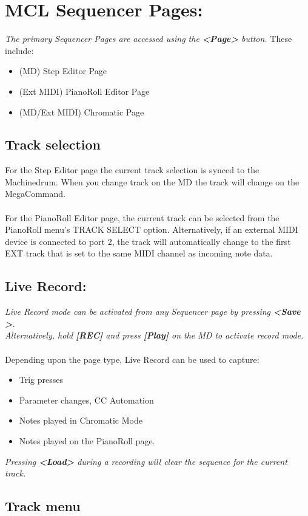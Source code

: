 \chapter{MCL Sequencer Pages:}

\textit{The primary Sequencer Pages are accessed using the \textbf{<Page>} button.} These include:
\begin{itemize}
    \item (MD) Step Editor Page
    \item (Ext MIDI) PianoRoll Editor Page
    \item (MD/Ext MIDI) Chromatic Page
\end{itemize}
\section{Track selection}
For the Step Editor page the current track selection is synced to the Machinedrum. When you change track on the MD the track will change on the MegaCommand.\\\\
For the PianoRoll Editor page, the current track can be selected from the PianoRoll menu's TRACK SELECT option. Alternatively, if an external MIDI device is connected to port 2, the track will automatically change to the first EXT track that is set to the same MIDI channel as incoming note data.
\section{Live Record:}
\textit{Live Record mode can be activated from any Sequencer page by pressing \textbf{<Save >}.\\Alternatively, hold \textbf{[REC]} and press \textbf{[Play]} on the MD to activate record mode.}\\\\Depending upon the page type, Live Record can be used to capture:
\begin{itemize}
    \item Trig presses
    \item Parameter changes, CC Automation
    \item Notes played in Chromatic Mode
    \item Notes played on the PianoRoll page.
\end{itemize}
\textit{Pressing \textbf{<Load>} during a recording will clear the sequence for the current track.}

\newpage
\section{Track menu}

